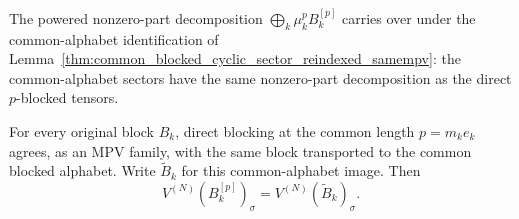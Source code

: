\begin{lemma}%
    \label{thm:common_blocked_cyclic_sector_reindexed_nonzero_part}
    \leanok
    The powered nonzero-part decomposition
    $\bigoplus_k \mu_k^p B_k^{[p]}$ carries over under the common-alphabet
    identification of
    Lemma~\ref{thm:common_blocked_cyclic_sector_reindexed_samempv}: the
    common-alphabet sectors have the same nonzero-part decomposition as the direct
    $p$-blocked tensors.
\end{lemma}

\begin{lemma}%
    \label{thm:common_blocked_cyclic_sector_block_tensor_common_reindexed}
    \leanok
    For every original block $B_k$, direct blocking at the common length
    $p=m_k e_k$ agrees, as an MPV family, with the same block transported to the
    common blocked alphabet. Write $\widetilde B_k$ for this common-alphabet
    image. Then
    \[
        V^{(N)}\!(B_k^{[p]})_\sigma
        =
        V^{(N)}\!(\widetilde B_k)_\sigma.
    \]
\end{lemma}
